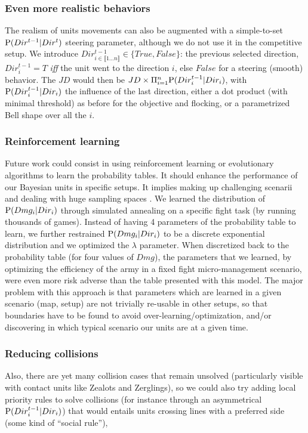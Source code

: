 \subsubsection{Even more realistic behaviors}
The realism of units movements can also be augmented with a simple-to-set $\mathrm{P}(Dir^{t-1}|Dir^t)$ steering parameter, although we do not use it in the competitive setup. We introduce $Dir_{i \in \llbracket 1 \dots n\rrbracket }^{t-1} \in \{True, False\}$: the previous selected direction, $Dir_i^{t-1} = T$ \textit{iff} the unit went to the direction $i$, else $False$ for a steering (smooth) behavior. The $JD$ would then be $JD \times \Pi_{i=1}^{n} \mathrm{P}(Dir_i^{t-1} | Dir_i)$, with $\mathrm{P}(Dir_i^{t-1} | Dir_i)$ the influence of the last direction, either a dot product (with minimal threshold) as before for the objective and flocking, or a parametrized Bell shape over all the $i$.

\subsubsection{Reinforcement learning}
Future work could consist in using reinforcement learning \citep{Sutton} or evolutionary algorithms \citep{SmithCIG10} to learn the probability tables. It should enhance the performance of our Bayesian units in specific setups. It implies making up challenging scenarii and dealing with huge sampling spaces \citep{Asmuth09}. We learned the distribution of $\mathrm{P}(Dmg_i | Dir_i)$ through simulated annealing on a specific fight task (by running thousands of games). Instead of having 4 parameters of the probability table to learn, we further restrained $\mathrm{P}(Dmg_i|Dir_i)$ to be a discrete exponential distribution and we optimized the $\lambda$ parameter. When discretized back to the probability table (for four values of $Dmg$), the parameters that we learned, by optimizing the efficiency of the army in a fixed fight micro-management scenario, were even more risk adverse than the table presented with this model. The major problem with this approach is that parameters which are learned in a given scenario (map, setup) are not trivially re-usable in other setups, so that boundaries have to be found to avoid over-learning/optimization, and/or discovering in which typical scenario our units are at a given time.

\subsubsection{Reducing collisions}
\label{sec:microreducingcollisions}
Also, there are yet many collision cases that remain unsolved (particularly visible with contact units like Zealots and Zerglings), so we could also try adding local priority rules to solve collisions (for instance through an asymmetrical $\mathrm{P}(Dir_i^{t-1}|Dir_i)$) that would entails units crossing lines with a preferred side (some kind of ``social rule''),

